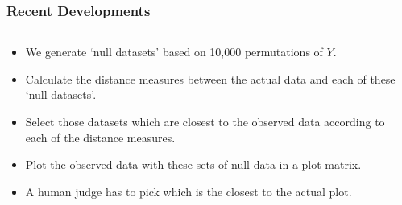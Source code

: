 \documentclass{beamer}
\begin{document}
\begin{frame}
\frametitle{Recent Developments}
	\begin{columns}

	\begin{column}{0.55\textwidth}
		\begin{itemize}
		\item We generate `null datasets' based on 10,000 permutations of $Y$.
		\item Calculate the distance measures between the actual data and each of these `null datasets'. 
		\item Select those datasets which are closest to the observed data according to each of  the distance measures.
		\item Plot the observed data with these sets of null data in a plot-matrix.
		\item A human judge has to pick which is the closest to the actual plot.
		\end{itemize}
	\end{column}

	\begin{column}{0.45\textwidth}
		 \begin{center}
		 \end{center}
	\end{column}
\end{columns}
\end{frame}
\end{document}
